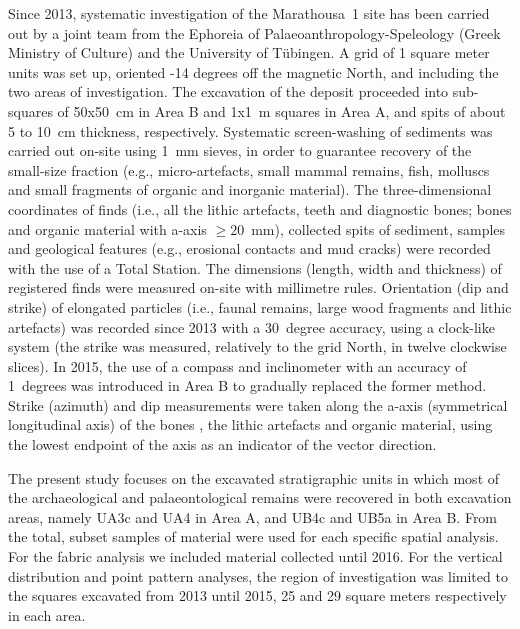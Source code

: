 \documentclass[review,authoryear,times]{elsarticle} %
\begin{document}
Since 2013, systematic investigation of the Marathousa~1 site has been carried out by a joint team from the Ephoreia of Palaeoanthropology-Speleology (Greek Ministry of Culture) and the University of Tübingen. A grid of 1 square meter units was set up, oriented -14 degrees off the magnetic North, and including the two areas of investigation. The excavation of the deposit proceeded into sub-squares of 50x50~cm in Area B and 1x1~m squares in Area A, and spits of about 5 to 10~cm thickness, respectively. Systematic screen-washing of sediments was carried out on-site using 1~mm sieves, in order to guarantee recovery of the small-size fraction (e.g., micro-artefacts, small mammal remains, fish, molluscs and small fragments of organic and inorganic material). The three-dimensional coordinates of finds (i.e., all the lithic artefacts, teeth and diagnostic bones; bones and organic material with a-axis $\geq20$~mm), collected spits of sediment, samples and geological features (e.g., erosional contacts and mud cracks) were recorded with the use of a Total Station. The dimensions (length, width and thickness) of registered finds were measured on-site with millimetre rules. Orientation (dip and strike) of elongated particles (i.e., faunal remains, large wood fragments and lithic artefacts) was recorded since 2013 with a 30~degree accuracy, using a clock-like system (the strike was measured, relatively to the grid North, in twelve clockwise slices). In 2015, the use of a compass and inclinometer with an accuracy of 1~degrees was introduced in Area B to gradually replaced the former method. Strike (azimuth) and dip measurements were taken along the a-axis (symmetrical longitudinal axis) of the bones \citep{Dominguez-Rodrigo2013}, the lithic artefacts \citep{Bertran1995} and organic material, using the lowest endpoint of the axis as an indicator of the vector direction.

The present study focuses on the excavated stratigraphic units in which most of the archaeological and palaeontological remains were recovered in both excavation areas, namely UA3c and UA4 in Area A, and UB4c and UB5a in Area B. From the total, subset samples of material were used for each specific spatial analysis. For the fabric analysis we included material collected until 2016. For the vertical distribution and point pattern analyses, the region of investigation was limited to the squares excavated from 2013 until 2015, 25 and 29 square meters respectively in each area.
\end{document}
